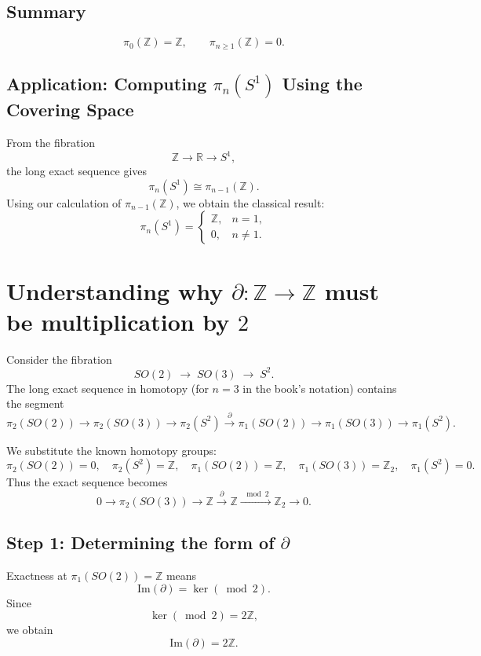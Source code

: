 \documentclass[12pt]{article}
\begin{document}
\subsection{Summary}

\[
\boxed{
\pi_0(\mathbb{Z})=\mathbb{Z},\qquad
\pi_{n\ge1}(\mathbb{Z})=0.
}
\]

\subsection{Application: Computing $\pi_n(S^1)$ Using the Covering Space}

From the fibration
\[
\mathbb{Z}\longrightarrow \mathbb{R}\longrightarrow S^1,
\]
the long exact sequence gives
\[
\pi_n(S^1)\cong \pi_{n-1}(\mathbb{Z}).
\]
Using our calculation of $\pi_{n-1}(\mathbb{Z})$, we obtain the classical result:
\[
\pi_n(S^1)=
\begin{cases}
\mathbb{Z}, & n=1,\\[4pt]
0, & n\ne 1.
\end{cases}
\]

\section{Understanding why $\partial : \mathbb{Z} \to \mathbb{Z}$ must be multiplication by $2$}

Consider the fibration
\[
SO(2)\;\longrightarrow\; SO(3)\;\longrightarrow\; S^{2}.
\]
The long exact sequence in homotopy (for $n=3$ in the book's notation) contains the segment
\[
\pi_2(SO(2)) \longrightarrow \pi_2(SO(3))
   \longrightarrow \pi_2(S^2) \xrightarrow{\;\partial\;}
   \pi_1(SO(2)) \longrightarrow \pi_1(SO(3)) \longrightarrow \pi_1(S^2).
\]

We substitute the known homotopy groups:
\[
\pi_2(SO(2)) = 0,\quad
\pi_2(S^2) = \mathbb{Z},\quad
\pi_1(SO(2)) = \mathbb{Z},\quad
\pi_1(SO(3)) = \mathbb{Z}_2,\quad
\pi_1(S^2)=0.
\]
Thus the exact sequence becomes
\[
0 \longrightarrow \pi_2(SO(3))
   \longrightarrow \mathbb{Z} \xrightarrow{\;\partial\;}
   \mathbb{Z} \xrightarrow{\;\bmod 2\;}
   \mathbb{Z}_2 \longrightarrow 0.
\]

\subsection{Step 1: Determining the form of $\partial$}

Exactness at $\pi_1(SO(2))=\mathbb{Z}$ means
\[
\mathrm{Im}(\partial)=\ker(\bmod 2).
\]
Since
\[
\ker(\bmod 2)=2\mathbb{Z},
\]
we obtain
\[
\mathrm{Im}(\partial)=2\mathbb{Z}.
\]
\end{document}
